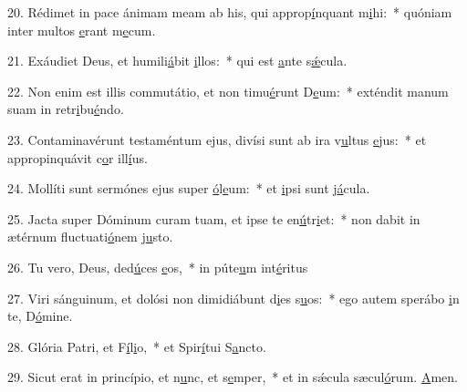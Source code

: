 20. Rédimet in pace ánimam meam ab his, qui approp\uline{í}nquant m\uline{i}hi:~* quóniam inter multos \uline{e}rant m\uline{e}cum.\par 
21. Exáudiet Deus, et humili\uline{á}bit \uline{i}llos:~* qui est \uline{a}nte s\uline{ǽ}cula.\par 
22. Non enim est illis commutátio, et non timu\uline{é}runt D\uline{e}um:~* exténdit manum suam in retr\uline{i}bu\uline{é}ndo.\par 
23. Contaminavérunt testaméntum ejus, divísi sunt ab ira v\uline{u}ltus \uline{e}jus:~* et appropinquávit c\uline{o}r ill\uline{í}us.\par 
24. Mollíti sunt sermónes ejus super \uline{ó}l\uline{e}um:~* et \uline{i}psi sunt j\uline{á}cula.\par 
25. Jacta super Dóminum curam tuam, et ipse te en\uline{ú}tr\uline{i}et:~* non dabit in ætérnum fluctuati\uline{ó}nem j\uline{u}sto.\par 
26. Tu vero, Deus, ded\uline{ú}ces \uline{e}os,~* in púte\uline{u}m int\uline{é}ritus\par 
27. Viri sánguinum, et dolósi non dimidiábunt d\uline{i}es s\uline{u}os:~* ego autem sperábo \uline{i}n te, D\uline{ó}mine.\par 
28. Glória Patri, et F\uline{í}l\uline{i}o,~* et Spir\uline{í}tui S\uline{a}ncto.\par 
29. Sicut erat in princípio, et n\uline{u}nc, et s\uline{e}mper,~* et in sǽcula sæcul\uline{ó}rum. \uline{A}men.\par 
